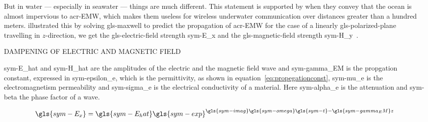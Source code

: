 But in water --- especially in seawater --- things are much different. This statement is supported by 
\citet{ramakrishna_next_2012} when they convey that the ocean is almost impervious to \gls{acr-EMW}, which makes them
useless for wireless underwater communication over distances greater than a hundred meters. 
\citet{hagman_elias_design_2009} illustrated this by solving \gls{gls-maxwell} to predict the propagation of 
\gls{acr-EMW} for the case of a linearly \gls{gls-polarized-plane} travelling in \(z\)-direction, we get the 
\gls{gls-electric-field} strength \gls{sym-E_x}  and the \gls{gls-magnetic-field} strength 
\gls{sym-H_y}~\cite{hagman_elias_design_2009}.

\begin{RoyalFigure}[!htb, label=fig:elecmagdamp]{DAMPENING OF ELECTRIC AND MAGNETIC FIELD}
\end{RoyalFigure}

\gls{sym-E_hat}  and \gls{sym-H_hat} are the amplitudes of the electric and the magnetic field wave and 
\gls{sym-gamma_EM} is the propgation constant, expressed in \gls{sym-epsilon_e}, which is the permittivity, as shown 
in equation~\ref{eq:propegationconst}, \gls{sym-mu_e} is the electromagnetism permeability and \gls{sym-sigma_e} is 
the electrical conductivity of a material. Here \gls{sym-alpha_e} is the attenuation and \gls{sym-beta} the phase 
factor of a wave.

\begin{equation}
    \label{eq:MaxwellE}
    \gls{sym-E_x} = \gls{sym-E_hat} \gls{sym-exp}^{\gls{sym-imag}  \gls{sym-omega}  \gls{sym-t}  - \gls{sym-gamma_EM}
    z}
\end{equation}

